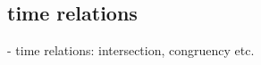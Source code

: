 \begin{comment}
<abjad>
timespan.start_offset
</abjad>
\end{comment}

\begin{comment}
<abjad>
timespan.stop_offset
</abjad>
\end{comment}

\begin{comment}
<abjad>
timespan.duration
</abjad>
\end{comment}

\begin{comment}
<abjad>
timespan.is_well_formed
</abjad>
\end{comment}

\begin{comment}
<abjad>
malformed_timespan = timespantools.Timespan(0, 0)
malformed_timespan.is_well_formed
</abjad>
\end{comment}

\begin{comment}
<abjad>
templated_timespan = new(timespan, stop_offset=(5, 16))
print(format(templated_timespan))
</abjad>
\end{comment}

\begin{comment}
<abjad>
annotated_timespan = timespantools.AnnotatedTimespan(
    start_offset=(1, 8),
    stop_offset=(7, 8),
    annotation='Any arbitrary object can act as an annotation.'
    )
annotated_timespan.annotation
</abjad>
\end{comment}

\subsection{time relations}

- time relations: intersection, congruency etc.

\begin{comment}
<abjad>
timespan_1 = timespantools.Timespan(0, 10)
timespan_2 = timespantools.Timespan(5, 15)
timespan_3 = timespantools.Timespan(10, 15)
</abjad>
\end{comment}

\begin{comment}
<abjad>
timespan_1.intersects_timespan(timespan_2)
timespan_1.intersects_timespan(timespan_3)
timespan_2.intersects_timespan(timespan_1)
timespan_2.intersects_timespan(timespan_3)
timespan_3.intersects_timespan(timespan_1)
timespan_3.intersects_timespan(timespan_2)
</abjad>
\end{comment}

